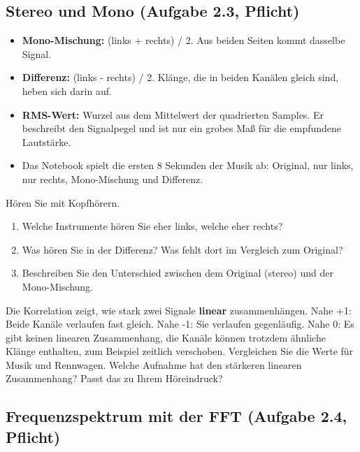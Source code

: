 \documentclass[11pt]{article}
\begin{document}
\subsection[Stereo und Mono]{Stereo und Mono (Aufgabe 2.3, Pflicht)}


\begin{itemize}
  \item \textbf{Mono-Mischung:} (links + rechts) / 2. Aus beiden Seiten kommt dasselbe Signal.
  \item \textbf{Differenz:} (links - rechts) / 2. Klänge, die in beiden Kanälen gleich sind, heben sich darin auf.
  \item \textbf{RMS-Wert:} Wurzel aus dem Mittelwert der quadrierten Samples. Er beschreibt den Signalpegel und ist nur ein grobes Maß für die empfundene Lautstärke.
  \item Das Notebook spielt die ersten 8 Sekunden der Musik ab: Original, nur links, nur rechts, Mono-Mischung und Differenz.
\end{itemize}

\begin{block}
Hören Sie mit Kopfhörern.
\begin{enumerate}
  \item Welche Instrumente hören Sie eher links, welche eher rechts?
  \item Was hören Sie in der Differenz? Was fehlt dort im Vergleich zum Original?
  \item Beschreiben Sie den Unterschied zwischen dem Original (stereo) und der Mono-Mischung.
\end{enumerate}
\end{block}

\begin{block}
Die Korrelation zeigt, wie stark zwei Signale \textbf{linear} zusammenhängen. Nahe +1: Beide Kanäle verlaufen fast gleich. Nahe -1: Sie verlaufen gegenläufig. Nahe 0: Es gibt keinen linearen Zusammenhang, die Kanäle können trotzdem ähnliche Klänge enthalten, zum Beispiel zeitlich verschoben. Vergleichen Sie die Werte für Musik und Rennwagen. Welche Aufnahme hat den stärkeren linearen Zusammenhang? Passt das zu Ihrem Höreindruck?
\end{block}

\subsection[Frequenzspektrum mit der FFT]{Frequenzspektrum mit der FFT (Aufgabe 2.4, Pflicht)}
\end{document}
